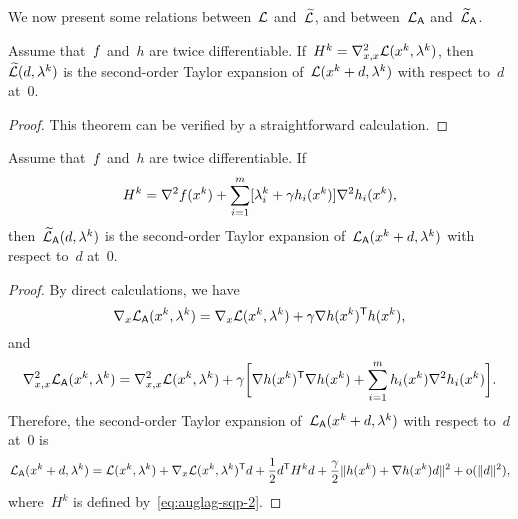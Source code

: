 We now present some relations between~$\lag$ and~$\lagalt$, and between~$\mathcal{L}_{\mathsf{A}}$ and~$\widetilde{\mathcal{L}}_{\mathsf{A}}$.

\begin{theorem}
    \label{thm:auglag-sqp-1}
    Assume that~$f$ and~$h$ are twice differentiable.
    If~$H^k = \nabla_{x, x}^2 \lag(\iter[k], \lm[k])$, then~$\lagalt(\step, \lm[k])$ is the second-order Taylor expansion of~$\lag(\iter[k] + \step, \lm[k])$ with respect to~$d$ at~$0$.
\end{theorem}

\begin{proof}
    This theorem can be verified by a straightforward calculation.
\end{proof}

\begin{theorem}
    \label{thm:auglag-sqp-2}
    Assume that~$f$ and~$h$ are twice differentiable.
    If
    \begin{equation}
        \label{eq:auglag-sqp-2}
        H^k = \nabla^2 \obj(\iter[k]) + \sum_{i = 1}^m [\lm[k]_i + \gamma h_i(\iter[k])] \nabla^2 h_i(\iter[k]),
    \end{equation}
    then~$\auglagalt(\step, \lm[k])$ is the second-order Taylor expansion of~$\auglag(\iter[k] + d, \lm[k])$ with respect to~$d$ at~$0$.
\end{theorem}

\begin{proof}
    By direct calculations, we have
    \begin{equation*}
        \nabla_x \auglag(\iter[k], \lm[k]) = \nabla_x \lag(\iter[k], \lm[k]) + \gamma \nabla h(\iter[k])^{\T} h(\iter[k]),
    \end{equation*}
    and
    \begin{equation*}
        \nabla_{x, x}^2 \auglag(\iter[k], \lm[k]) = \nabla_{x, x}^2 \lag(\iter[k], \lm[k]) + \gamma \bigg[ \nabla h(\iter[k])^{\T} \nabla h(\iter[k]) + \sum_{i = 1}^m h_i(\iter[k]) \nabla^2 h_i(\iter[k]) \bigg].
    \end{equation*}
    Therefore, the second-order Taylor expansion of~$\auglag(\iter[k] + d, \lm[k])$ with respect to~$d$ at~$0$ is
    \begin{equation*}
        \auglag(\iter[k] + d, \lm[k]) = \lag(\iter[k], \lm[k]) + \nabla_x \lag(\iter[k], \lm[k])^{\T} d + \frac{1}{2} d^{\T} H^k d + \frac{\gamma}{2} \norm{h(\iter[k]) + \nabla h(\iter[k]) d}^2 + \smallo(\norm{d}^2),
    \end{equation*}
    where~$H^k$ is defined by~\cref{eq:auglag-sqp-2}.
\end{proof}

